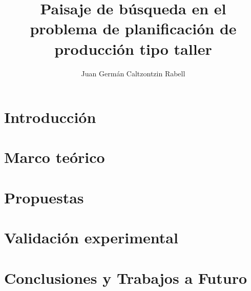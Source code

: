 \documentclass[12pt,letterpaper]{book}
\author{Juan Germán Caltzontzin Rabell}
\title{Paisaje de búsqueda en el problema de planificación de producción tipo taller}
\begin{document}

\pagebreak \frontmatter
 \newpage

\dominitoc \tableofcontents \let\cleardoublepage\clearpage

\mainmatter

\chapter{Introducción}\label{cap:introduccion}  \minitoc





\newpage

\chapter{Marco teórico}\label{cap:marcot} \minitoc



\newpage

\chapter{Propuestas}\label{cap:prop}




\chapter{Validación experimental}



\newpage
\chapter{Conclusiones y Trabajos a Futuro}\label{cap:ct} \minitoc


\appendix
 \newpage



\end{document}
